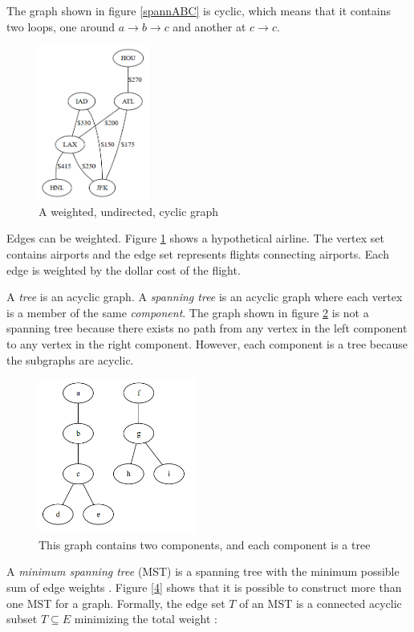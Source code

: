 \documentclass{book}
\begin{document}
The graph shown in figure \ref{spannABC} is cyclic, which means that it contains two loops, one around $a \to b \to c$ and another at $c \to c$.

\begin{figure}[ht]
\centering
\includegraphics[height=2in]{ch-spann/02}
\caption{A weighted, undirected, cyclic graph}
\label{2}
\end{figure}

Edges can be weighted. Figure \ref{2} shows a hypothetical airline. The vertex set contains airports and the edge set represents flights connecting airports. Each edge is weighted by the dollar cost of the flight.

A \textit{tree} is an acyclic graph. A \textit{spanning tree} is an acyclic graph where each vertex is a member of the same \textit{component}. The graph shown in figure \ref{3} is not a spanning tree because there exists no path from any vertex in the left component to any vertex in the right component. However, each component is a tree because the subgraphs are acyclic.

\begin{figure}[ht]
\centering
\includegraphics[height=2in]{ch-spann/03}
\caption{This graph contains two components, and each component is a tree}
\label{3}
\end{figure}

A \textit{minimum spanning tree} (MST) is a spanning tree with the minimum possible sum of edge weights \cite{rosen2003discrete}. Figure \ref{4} shows that it is possible to construct more than one MST for a graph. Formally, the edge set $T$ of an MST is a connected acyclic subset $T \subseteq E$ minimizing the total weight \cite{cormen2001introduction}:
\end{document}
